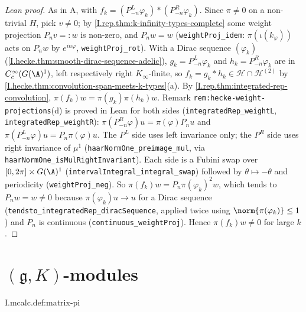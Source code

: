 \begin{proof}[Lean proof]
As in A, with $f_k=(P^L_{-n}\varphi_k)\ast(P^R_{-n}\varphi_k)$. Since $\pi\ne0$ on a non-trivial $H$, pick $v\ne0$; by \cref{I.rep.thm:k-infinity-types-complete} some weight projection $P_nv=:w$ is non-zero, and $P_nw=w$ (\texttt{weightProj\_idem}: $\pi(\iota(k_\varphi))$ acts on $P_nw$ by $e^{in\varphi}$, \texttt{weightProj\_rot}). With a Dirac sequence $(\varphi_k)$ (\cref{I.hecke.thm:smooth-dirac-sequence-adelic}), $g_k=P^L_{-n}\varphi_k$ and $h_k=P^R_{-n}\varphi_k$ are in $C_c^\infty(G(\A)^1)$, left respectively right $K_\infty$-finite, so $f_k=g_k\ast h_k\in\mathcal H\cap\mathcal H^{(2)}$ by \cref{I.hecke.thm:convolution-span-meets-k-types}(a). By \cref{I.rep.thm:integrated-rep-convolution}, $\pi(f_k)w=\pi(g_k)\pi(h_k)w$. Remark \texttt{rem:hecke-weight-projections}(d) is proved in Lean for both sides (\texttt{integratedRep\_weightL}, \texttt{integratedRep\_weightR}): $\pi(P^R_{-n}\varphi)u=\pi(\varphi)P_nu$ and $\pi(P^L_{-n}\varphi)u=P_n\pi(\varphi)u$. The $P^L$ side uses left invariance only; the $P^R$ side uses right invariance of $\mu^1$ (\texttt{haarNormOne\_preimage\_mul}, via \texttt{haarNormOne\_isMulRightInvariant}). Each side is a Fubini swap over $[0,2\pi]\times G(\A)^1$ (\texttt{intervalIntegral\_integral\_swap}) followed by $\theta\mapsto-\theta$ and periodicity (\texttt{weightProj\_neg}). So $\pi(f_k)w=P_n\pi(\varphi_k)^2w$, which tends to $P_nw=w\ne0$ because $\pi(\varphi_k)u\to u$ for a Dirac sequence (\texttt{tendsto\_integratedRep\_diracSequence}, applied twice using $\norm{\pi(\varphi_k)}\le1$) and $P_n$ is continuous (\texttt{continuous\_weightProj}). Hence $\pi(f_k)w\neq0$ for large $k$.
\end{proof}

\section{\texorpdfstring{$(\mathfrak{g},K)$-modules}{(𝔤,K)-modules}}
\begin{definition}
\bonly
{}
\end{definition}
\begin{tfformal}{I.mcalc.def:matrix-pi}
\end{tfformal}


